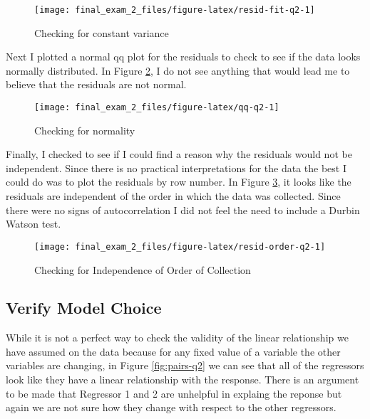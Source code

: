 \documentclass[]{book}
\begin{document}
\begin{figure}

{\centering \texttt{[image: final\_exam\_2\_files/figure-latex/resid-fit-q2-1]} 

}

\caption{Checking for constant variance}\label{fig:resid-fit-q2}
\end{figure}

Next I plotted a normal qq plot for the residuals to check to see if the data looks normally distributed. In Figure \ref{fig:qq-q2}, I do not see anything that would lead me to believe that the residuals are not normal.

\begin{figure}

{\centering \texttt{[image: final\_exam\_2\_files/figure-latex/qq-q2-1]} 

}

\caption{Checking for normality}\label{fig:qq-q2}
\end{figure}

Finally, I checked to see if I could find a reason why the residuals would not be independent. Since there is no practical interpretations for the data the best I could do was to plot the residuals by row number. In Figure \ref{fig:resid-order-q2}, it looks like the residuals are independent of the order in which the data was collected. Since there were no signs of autocorrelation I did not feel the need to include a Durbin Watson test.

\begin{figure}

{\centering \texttt{[image: final\_exam\_2\_files/figure-latex/resid-order-q2-1]} 

}

\caption{Checking for Independence of Order of Collection}\label{fig:resid-order-q2}
\end{figure}

\hypertarget{verify-model-choice}{%
\subsection{Verify Model Choice}\label{verify-model-choice}}

While it is not a perfect way to check the validity of the linear relationship we have assumed on the data because for any fixed value of a variable the other variables are changing, in Figure \ref{fig:pairs-q2} we can see that all of the regressors look like they have a linear relationship with the response. There is an argument to be made that Regressor 1 and 2 are unhelpful in explaing the reponse but again we are not sure how they change with respect to the other regressors.
\end{document}
